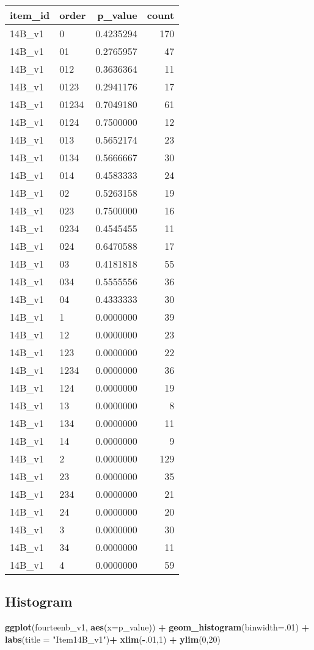 \documentclass[]{book}
\newenvironment{Shaded}{\begin{snugshade}}{\end{snugshade}}
\newcommand{\KeywordTok}[1]{\textcolor[rgb]{0.13,0.29,0.53}{\textbf{#1}}}
\newcommand{\DataTypeTok}[1]{\textcolor[rgb]{0.13,0.29,0.53}{#1}}
\newcommand{\DecValTok}[1]{\textcolor[rgb]{0.00,0.00,0.81}{#1}}
\newcommand{\StringTok}[1]{\textcolor[rgb]{0.31,0.60,0.02}{#1}}
\newcommand{\OperatorTok}[1]{\textcolor[rgb]{0.81,0.36,0.00}{\textbf{#1}}}
\newcommand{\NormalTok}[1]{#1}
\theoremstyle{definition}
\theoremstyle{definition}
\theoremstyle{definition}
\theoremstyle{remark}
\begin{document}
\begin{longtable}[]{@{}llrr@{}}
\toprule
item\_id & order & p\_value & count\tabularnewline
\midrule
\endhead
14B\_v1 & 0 & 0.4235294 & 170\tabularnewline
14B\_v1 & 01 & 0.2765957 & 47\tabularnewline
14B\_v1 & 012 & 0.3636364 & 11\tabularnewline
14B\_v1 & 0123 & 0.2941176 & 17\tabularnewline
14B\_v1 & 01234 & 0.7049180 & 61\tabularnewline
14B\_v1 & 0124 & 0.7500000 & 12\tabularnewline
14B\_v1 & 013 & 0.5652174 & 23\tabularnewline
14B\_v1 & 0134 & 0.5666667 & 30\tabularnewline
14B\_v1 & 014 & 0.4583333 & 24\tabularnewline
14B\_v1 & 02 & 0.5263158 & 19\tabularnewline
14B\_v1 & 023 & 0.7500000 & 16\tabularnewline
14B\_v1 & 0234 & 0.4545455 & 11\tabularnewline
14B\_v1 & 024 & 0.6470588 & 17\tabularnewline
14B\_v1 & 03 & 0.4181818 & 55\tabularnewline
14B\_v1 & 034 & 0.5555556 & 36\tabularnewline
14B\_v1 & 04 & 0.4333333 & 30\tabularnewline
14B\_v1 & 1 & 0.0000000 & 39\tabularnewline
14B\_v1 & 12 & 0.0000000 & 23\tabularnewline
14B\_v1 & 123 & 0.0000000 & 22\tabularnewline
14B\_v1 & 1234 & 0.0000000 & 36\tabularnewline
14B\_v1 & 124 & 0.0000000 & 19\tabularnewline
14B\_v1 & 13 & 0.0000000 & 8\tabularnewline
14B\_v1 & 134 & 0.0000000 & 11\tabularnewline
14B\_v1 & 14 & 0.0000000 & 9\tabularnewline
14B\_v1 & 2 & 0.0000000 & 129\tabularnewline
14B\_v1 & 23 & 0.0000000 & 35\tabularnewline
14B\_v1 & 234 & 0.0000000 & 21\tabularnewline
14B\_v1 & 24 & 0.0000000 & 20\tabularnewline
14B\_v1 & 3 & 0.0000000 & 30\tabularnewline
14B\_v1 & 34 & 0.0000000 & 11\tabularnewline
14B\_v1 & 4 & 0.0000000 & 59\tabularnewline
\bottomrule
\end{longtable}

\subsection{Histogram}\label{histogram-1}

\begin{Shaded}
\begin{Highlighting}[]
\KeywordTok{ggplot}\NormalTok{(fourteenb_v1, }\KeywordTok{aes}\NormalTok{(}\DataTypeTok{x=}\NormalTok{p_value)) }\OperatorTok{+}\StringTok{ }\KeywordTok{geom_histogram}\NormalTok{(}\DataTypeTok{binwidth=}\NormalTok{.}\DecValTok{01}\NormalTok{) }\OperatorTok{+}\StringTok{ }\KeywordTok{labs}\NormalTok{(}\DataTypeTok{title =} \StringTok{"Item14B_v1"}\NormalTok{)}\OperatorTok{+}\StringTok{ }\KeywordTok{xlim}\NormalTok{(}\OperatorTok{-}\NormalTok{.}\DecValTok{01}\NormalTok{,}\DecValTok{1}\NormalTok{) }\OperatorTok{+}\StringTok{ }\KeywordTok{ylim}\NormalTok{(}\DecValTok{0}\NormalTok{,}\DecValTok{20}\NormalTok{)}
\end{Highlighting}
\end{Shaded}
\end{document}
